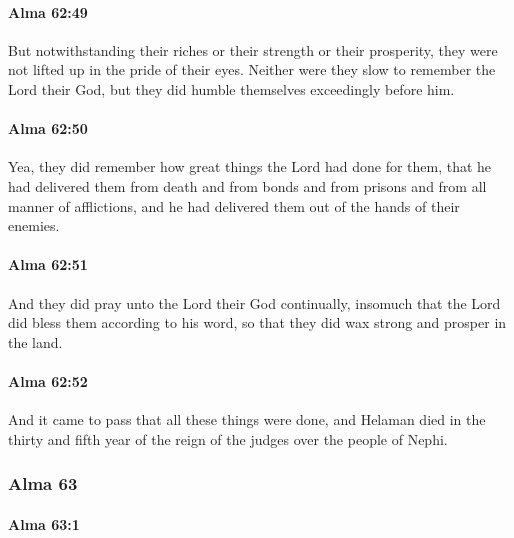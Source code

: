		\paragraph{Alma 62:49} %
			\label{ALMA-62-49}

			But notwithstanding their riches or their strength or their prosperity,
			they were not lifted up in the pride of their eyes.
			Neither were they slow to remember the Lord their God,
			but they did humble themselves exceedingly before him.

		\paragraph{Alma 62:50} %
			\label{ALMA-62-50}

			Yea, they did remember how great things the Lord had done for them,
			that he had delivered them from death and from bonds and from prisons
			and from all manner of afflictions,
			and he had delivered them out of the hands of their enemies.

		\paragraph{Alma 62:51} %
			\label{ALMA-62-51}

			And they did pray unto the Lord their God continually,
			insomuch that the Lord did bless them according to his word,
			so that they did wax strong and prosper in the land.

		\paragraph{Alma 62:52} %
			\label{ALMA-62-52}

			And it came to pass that all these things were done,
			and Helaman died in the thirty and fifth year
			of the reign of the judges over the people of Nephi.

	\subsubsection{Alma 63} %
		\label{ALMA-63}
		
		\paragraph{Alma 63:1} %
			\label{ALMA-63-1}

